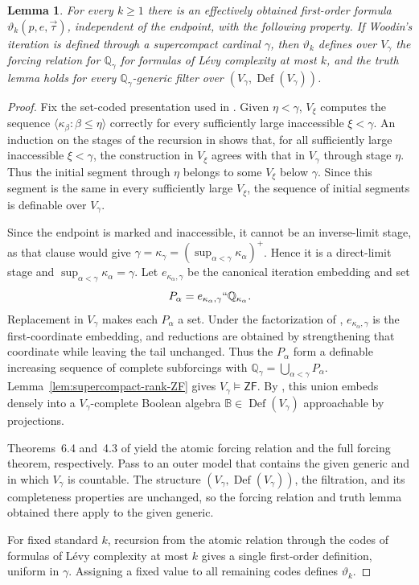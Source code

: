 \documentclass[11pt,a4paper]{amsart}
\newcommand{\ZF}{\mathsf{ZF}}
\newcommand{\Def}{\operatorname{Def}}
\theoremstyle{plain}
\newtheorem{lemma}[theorem]{Lemma}
\theoremstyle{definition}
\theoremstyle{remark}
\begin{document}
\begin{lemma}\label{lem:Woodin-endpoint-forcing}
{For every $k\geq1$ there is an effectively obtained first-order formula $\vartheta_k(p,e,\vec\tau)$, independent of the endpoint, with the following property.  If Woodin's iteration is defined through a supercompact cardinal $\gamma$, then $\vartheta_k$ defines over $V_\gamma$ the forcing relation for $\mathbb Q_\gamma$ for formulas of L\'evy complexity at most $k$, and the truth lemma holds for every $\mathbb Q_\gamma$-generic filter over $(V_\gamma,\Def(V_\gamma))$.}
\end{lemma}

\begin{proof}
\begingroup

Fix the set-coded presentation used in \cite[Theorem~44(v)]{Spoerl}.  Given $\eta<\gamma$, $V_\xi$ computes the sequence $\langle\kappa_\beta:\beta\leq\eta\rangle$ correctly for every sufficiently large inaccessible $\xi<\gamma$.  An induction on the stages of the recursion in \cite[Definition~43]{Spoerl} shows that, for all sufficiently large inaccessible $\xi<\gamma$, the construction in $V_\xi$ agrees with that in $V_\gamma$ through stage $\eta$.  Thus the initial segment through $\eta$ belongs to some $V_\xi$ below $\gamma$.  Since this segment is the same in every sufficiently large $V_\xi$, the sequence of initial segments is definable over $V_\gamma$.

Since the endpoint is marked and inaccessible, it cannot be an inverse-limit stage, as that clause would give $\gamma=\kappa_\gamma=(\sup_{\alpha<\gamma}\kappa_\alpha)^+$.  Hence it is a direct-limit stage and $\sup_{\alpha<\gamma}\kappa_\alpha=\gamma$.  Let $e_{\kappa_\alpha,\gamma}$ be the canonical iteration embedding and set
\[
P_\alpha=e_{\kappa_\alpha,\gamma}``\mathbb Q_{\kappa_\alpha}.
\]
Replacement in $V_\gamma$ makes each $P_\alpha$ a set.  Under the factorization of \cite[Theorem~44(iii)(a)]{Spoerl}, $e_{\kappa_\alpha,\gamma}$ is the first-coordinate embedding, and reductions are obtained by strengthening that coordinate while leaving the tail unchanged.  Thus the $P_\alpha$ form a definable increasing sequence of complete subforcings with
$\mathbb Q_\gamma=\bigcup_{\alpha<\gamma}P_\alpha$.  Lemma~\ref{lem:supercompact-rank-ZF} gives $V_\gamma\models\ZF$.  By \cite[Lemma~6.6]{HolyClassForcing}, this union embeds densely into a $V_\gamma$-complete Boolean algebra $\mathbb B\in\Def(V_\gamma)$ approachable by projections.

Theorems~6.4 and~4.3 of \cite{HolyClassForcing} yield the atomic forcing relation and the full forcing theorem, respectively.  Pass to an outer model that contains the given generic and in which $V_\gamma$ is countable.  The structure $(V_\gamma,\Def(V_\gamma))$, the filtration, and its completeness properties are unchanged, so the forcing relation and truth lemma obtained there apply to the given generic.

For fixed standard $k$, recursion from the atomic relation through the codes of formulas of L\'evy complexity at most $k$ gives a single first-order definition, uniform in $\gamma$.  Assigning a fixed value to all remaining codes defines $\vartheta_k$.
\endgroup
\end{proof}
\end{document}
